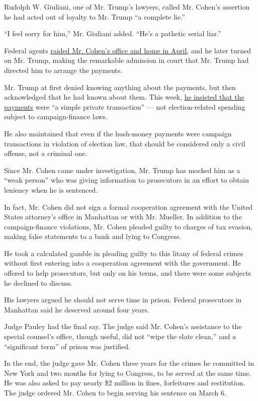 Rudolph W. Giuliani, one of Mr. Trump's lawyers, called Mr. Cohen's
assertion he had acted out of loyalty to Mr. Trump ``a complete lie.''

``I feel sorry for him,'' Mr. Giuliani added. ``He's a pathetic serial
liar.''

Federal agents
\href{https://www.nytimes.com/2018/04/09/us/politics/fbi-raids-office-of-trumps-longtime-lawyer-michael-cohen.html}{raided
Mr. Cohen's office and home in April}, and he later turned on Mr. Trump,
making the remarkable admission in court that Mr. Trump had directed him
to arrange the payments.

Mr. Trump at first denied knowing anything about the payments, but then
acknowledged that he had known about them. This week,
\href{https://www.nytimes.com/2018/12/10/us/politics/trump-campaign-finance-crimes-defense.html}{he
insisted that the payments} were ``a simple private transaction'' ---
not election-related spending subject to campaign-finance laws.

He also maintained that even if the hush-money payments were campaign
transactions in violation of election law, that should be considered
only a civil offense, not a criminal one.

Since Mr. Cohen came under investigation, Mr. Trump has mocked him as a
``weak person'' who was giving information to prosecutors in an effort
to obtain leniency when he is sentenced.

In fact, Mr. Cohen did not sign a formal cooperation agreement with the
United States attorney's office in Manhattan or with Mr. Mueller. In
addition to the campaign-finance violations, Mr. Cohen pleaded guilty to
charges of tax evasion, making false statements to a bank and lying to
Congress.

He took a calculated gamble in pleading guilty to this litany of federal
crimes without first entering into a cooperation agreement with the
government. He offered to help prosecutors, but only on his terms, and
there were some subjects he declined to discuss.

His lawyers argued he should not serve time in prison. Federal
prosecutors in Manhattan said he deserved around four years.

Judge Pauley had the final say. The judge said Mr. Cohen's assistance to
the special counsel's office, though useful, did not ``wipe the slate
clean,'' and a ``significant term'' of prison was justified.

In the end, the judge gave Mr. Cohen three years for the crimes he
committed in New York and two months for lying to Congress, to be served
at the same time. He was also asked to pay nearly \$2 million in fines,
forfeitures and restitution. The judge ordered Mr. Cohen to begin
serving his sentence on March 6.

